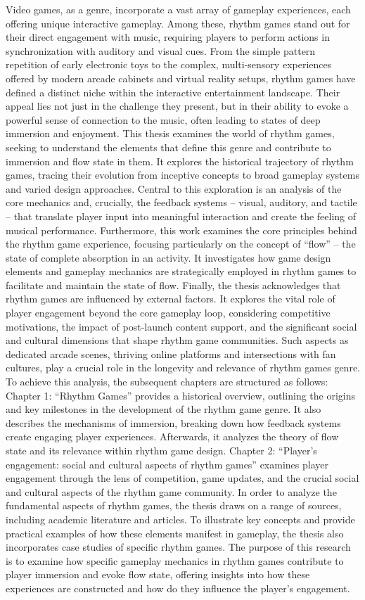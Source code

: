 Video games, as a genre, incorporate a vast array of gameplay experiences, each offering unique interactive gameplay. Among these, rhythm games stand out for their direct engagement with music, requiring players to perform actions in synchronization with auditory and visual cues. From the simple pattern repetition of early electronic toys to the complex, multi-sensory experiences offered by modern arcade cabinets and virtual reality setups, rhythm games have defined a distinct niche within the interactive entertainment landscape. Their appeal lies not just in the challenge they present, but in their ability to evoke a powerful sense of connection to the music, often leading to states of deep immersion and enjoyment.
This thesis examines the world of rhythm games, seeking to understand the elements that define this genre and contribute to immersion and flow state in them. It explores the historical trajectory of rhythm games, tracing their evolution from inceptive concepts to broad gameplay systems and varied design approaches. Central to this exploration is an analysis of the core mechanics and, crucially, the feedback systems -- visual, auditory, and tactile -- that translate player input into meaningful interaction and create the feeling of musical performance.
Furthermore, this work examines the core principles behind the rhythm game experience, focusing particularly on the concept of ``flow'' -- the state of complete absorption in an activity. It investigates how game design elements and gameplay mechanics are strategically employed in rhythm games to facilitate and maintain the state of flow.
Finally, the thesis acknowledges that rhythm games are influenced by external factors. It explores the vital role of player engagement beyond the core gameplay loop, considering competitive motivations, the impact of post-launch content support, and the significant social and cultural dimensions that shape rhythm game communities. Such aspects as dedicated arcade scenes, thriving online platforms and intersections with fan cultures, play a crucial role in the longevity and relevance of rhythm games genre. 
To achieve this analysis, the subsequent chapters are structured as follows: Chapter 1: ``Rhythm Games'' provides a historical overview, outlining the origins and key milestones in the development of the rhythm game genre. It also describes the mechanisms of immersion, breaking down how feedback systems create engaging player experiences. Afterwards, it analyzes the theory of flow state and its relevance within rhythm game design. Chapter 2: ``Player’s engagement: social and cultural aspects of rhythm games'' examines player engagement through the lens of competition, game updates, and the crucial social and cultural aspects of the rhythm game community.
In order to analyze the fundamental aspects of rhythm games, the thesis draws on a range of sources, including academic literature and articles. To illustrate key concepts and provide practical examples of how these elements manifest in gameplay, the thesis also incorporates case studies of specific rhythm games.
The purpose of this research is to examine how specific gameplay mechanics in rhythm games contribute to player immersion and evoke flow state, offering insights into how these experiences are constructed and how do they influence the player’s engagement.